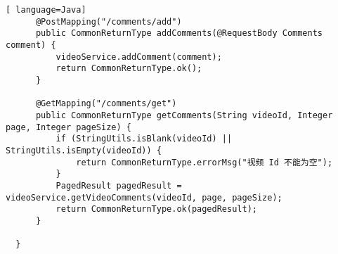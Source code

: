 \begin{lstlisting}[ language=Java]
      @PostMapping("/comments/add")
      public CommonReturnType addComments(@RequestBody Comments comment) {
          videoService.addComment(comment);
          return CommonReturnType.ok();
      }
  
      @GetMapping("/comments/get")
      public CommonReturnType getComments(String videoId, Integer page, Integer pageSize) {
          if (StringUtils.isBlank(videoId) || StringUtils.isEmpty(videoId)) {
              return CommonReturnType.errorMsg("视频 Id 不能为空");
          }
          PagedResult pagedResult = videoService.getVideoComments(videoId, page, pageSize);
          return CommonReturnType.ok(pagedResult);
      }
  
  }
  
\end{lstlisting}


